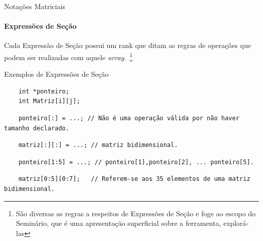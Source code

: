 \documentclass{beamer}
\begin{document}
\begin{frame}[fragile]{Notações Matriciais}
\framesubtitle{Expressões de Seção}
    Cada Expressão de Seção possui um rank que ditam as regras de operações que
    podem ser realizadas com aquele \textit{array}.~\footnote{São diversas as
    regras a respeitos de Expressões de Seção e foge ao escopo do Seminário,
    que é uma apresentação superficial sobre a ferramenta, explorá-las}
\begin{scriptsize}
\begin{block}{Exemplos de Expressões de Seção}
\begin{verbatim}
    int *ponteiro;
    int Matriz[i][j];
\end{verbatim}
\pause
\begin{verbatim}
    ponteiro[:] = ...; // Não é uma operação válida por não haver tamanho declarado.
\end{verbatim}
\pause
\begin{verbatim}
    matriz[:][:] = ...; // matriz bidimensional.
\end{verbatim}
\pause
\begin{verbatim}
    ponteiro[1:5] = ...; // ponteiro[1],ponteiro[2], ... ponteiro[5].
\end{verbatim}
\pause
\begin{verbatim}
    matriz[0:5][0:7]; 	// Referem-se aos 35 elementos de uma matriz bidimensional.
\end{verbatim}
\end{block}
\end{scriptsize}
\end{frame}
\end{document}

